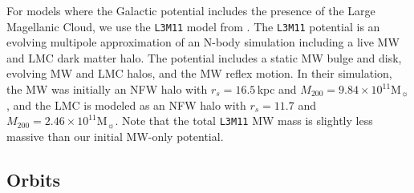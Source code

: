 \documentclass[linenumbers, twocolumn, twocolappendix]{aastex701}
\newcommand{\Mo}{\mathrm{M}_\sun}
\begin{document}
For models where the Galactic potential includes the presence of the Large Magellanic Cloud, we use the \texttt{L3M11} model from
\citet{vasiliev2024}. The \texttt{L3M11} potential is an evolving
multipole approximation of an N-body simulation including a live MW and
LMC dark matter halo. The potential includes a static MW bulge and disk,
evolving MW and LMC halos, and the MW reflex motion. In their
simulation, the MW was initially an NFW halo with $r_s=16.5\,$kpc and
$M_{200}= 9.84\times10^{11}\Mo$, and the LMC is modeled as an NFW halo with
$r_s=11.7$ and $M_{200} = 2.46 \times 10^{11} \Mo$. Note that the total
\texttt{L3M11} MW mass is slightly less massive than our initial \citet{EP2020}
MW-only potential.


\subsection{Orbits} \label{sec:point_orbits}
\end{document}

